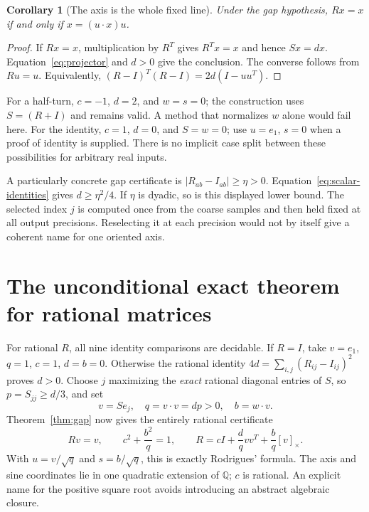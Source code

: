 \documentclass[11pt]{article}
\newtheorem{corollary}[theorem]{Corollary}
\theoremstyle{definition}\newtheorem{definition}[theorem]{Definition}
\newcommand{\Q}{\mathbb Q}\newcommand{\N}{\mathbb N}\newcommand{\R}{\mathbb R}
\newcommand{\crossmat}[1]{[#1]_{\times}}
\begin{document}
\begin{corollary}[The axis is the whole fixed line]\label{cor:fixedline}
Under the gap hypothesis, $Rx=x$ if and only if $x=(u\cdot x)u$.
\end{corollary}
\begin{proof}
If $Rx=x$, multiplication by $R^T$ gives $R^Tx=x$ and hence $Sx=dx$.
Equation~\eqref{eq:projector} and $d>0$ give the conclusion. The converse
follows from $Ru=u$. Equivalently,
$(R-I)^T(R-I)=2d(I-uu^T)$.
\end{proof}

For a half-turn, $c=-1$, $d=2$, and $w=s=0$; the construction uses
$S=(R+I)$ and remains valid. A method that normalizes $w$ alone would fail
here. For the identity, $c=1$, $d=0$, and $S=w=0$; use $u=e_1$, $s=0$
when a proof of identity is supplied. There is no implicit case split
between these possibilities for arbitrary real inputs.

A particularly concrete gap certificate is
$|R_{ab}-I_{ab}|\ge\eta>0$. Equation~\eqref{eq:scalar-identities} gives
$d\ge\eta^2/4$. If $\eta$ is dyadic, so is this displayed lower bound.
The selected index $j$ is computed once from the coarse samples and then
held fixed at all output precisions. Reselecting it at each precision
would not by itself give a coherent name for one oriented axis.

\section{The unconditional exact theorem for rational matrices}
\label{sec:rational}

For rational $R$, all nine identity comparisons are decidable. If $R=I$,
take $v=e_1$, $q=1$, $c=1$, $d=b=0$. Otherwise the rational identity
$4d=\sum_{i,j}(R_{ij}-I_{ij})^2$ proves $d>0$. Choose $j$ maximizing
the \emph{exact} rational diagonal entries of $S$, so $p=S_{jj}\ge d/3$,
and set
\begin{equation}\label{eq:rationalcertificate}
 v=Se_j,\quad q=v\cdot v=dp>0,\quad b=w\cdot v.
\end{equation}
Theorem~\ref{thm:gap} now gives the entirely rational certificate
\begin{equation}\label{eq:ratcert}
 Rv=v,\qquad c^2+\frac{b^2}{q}=1,\qquad
 R=cI+\frac{d}{q}vv^T+\frac{b}{q}\crossmat v.
\end{equation}
With $u=v/\sqrt q$ and $s=b/\sqrt q$, this is exactly Rodrigues' formula.
The axis and sine coordinates lie in one quadratic extension of $\Q$;
$c$ is rational. An explicit name for the positive square root avoids
introducing an abstract algebraic closure.
\end{document}

